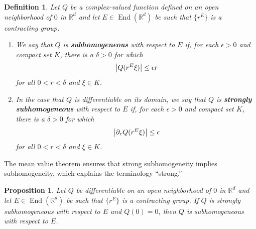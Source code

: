 \documentclass[11pt, letter]{book}
\newtheorem{definition}[theorem]{Definition}
\newtheorem{proposition}[theorem]{Proposition}
\newcommand\End{\operatorname{End}} %
\begin{document}
\begin{framed}
\begin{definition}\label{def:homogeneous_types}
Let $Q$ be a complex-valued function defined on an open neighborhood of $0$ in $\mathbb{R}^d$ and let $E\in\End(\mathbb{R}^d)$ be such that $\{r^E\}$ is a contracting group.
\begin{enumerate}
\item We say that $Q$ is \textbf{subhomogeneous} with respect to $E$ if, for each $\epsilon>0$ and compact set $K$, there is a $\delta>0$ for which
\begin{equation*}
\abs{Q(r^E\xi)}\leq \epsilon r
\end{equation*}
for all $0<r<\delta$ and $\xi\in K$.
\item In the case that $Q$ is differentiable on its domain, we say that $Q$ is \textbf{strongly subhomogeneous} with respect to $E$ if, for each $\epsilon>0$ and compact set $K$, there is a $\delta>0$ for which
\begin{equation*}
\abs{\partial_r Q(r^E\xi)}\leq \epsilon
\end{equation*}
for all $0<r<\delta$ and $\xi\in K$.
\end{enumerate}
\end{definition}
\end{framed}
\noindent The mean value theorem ensures that strong subhomogeneity implies subhomogeneity, which explains the terminology ``strong.''
\begin{framed}
\begin{proposition}\label{prop:supersub_implies_sub}
Let $Q$ be differentiable on an open neighborhood of $0$ in $\mathbb{R}^d$ and let $E\in\End(\mathbb{R}^d)$ be such that $\{r^E\}$ is a contracting group. If $Q$ is strongly subhomogeneous with respect to $E$ and $Q(0)=0$, then $Q$ is subhomogeneous with respect to $E$.
\end{proposition}
\end{framed}
\end{document}
